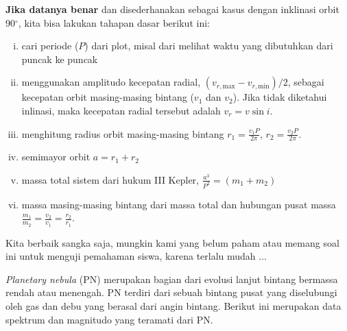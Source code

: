 \documentclass[11pt,fleqn]{exam}
\begin{document}
\begin{questions}
\vspace{1cm}
\textbf{Jika datanya benar} dan disederhanakan sebagai kasus dengan inklinasi orbit 90$^\circ$, kita bisa lakukan tahapan dasar berikut ini:
\begin{enumerate}[i.]
    \item cari periode ($P$) dari plot, misal dari melihat waktu yang dibutuhkan dari puncak ke puncak
    \item menggunakan amplitudo kecepatan radial, $(v_{r,\text{max}} - v_{r,\text{min}})/2$, sebagai kecepatan orbit masing-masing bintang ($v_1$ dan $v_2$). Jika tidak diketahui inlinasi, maka kecepatan radial tersebut adalah $v_r = v \sin{i}$.
    \item menghitung radius orbit masing-masing bintang $r_1 = \frac{v_1 P}{2 \pi}$, $r_2 = \frac{v_2 P}{2 \pi}$.
    \item semimayor orbit $a = r_1 + r_2$
    \item massa total sistem dari hukum III Kepler, $\frac{a^3}{P^2} = (m_1 + m_2)$
    \item massa masing-masing bintang dari massa total dan hubungan pusat massa $\frac{m_1}{m_2} = \frac{v_2}{v_1} = \frac{r_2}{r_1}$.
\end{enumerate}

\vspace{1cm}
Kita berbaik sangka saja, mungkin kami yang belum paham atau memang soal ini untuk menguji pemahaman siswa, karena terlalu mudah  ...

\newpage
\question \textit{Planetary nebula} (PN) merupakan bagian dari evolusi lanjut bintang bermassa rendah atau menengah. PN terdiri dari sebuah bintang pusat yang diselubungi oleh gas dan debu yang berasal dari angin bintang. Berikut ini merupakan data spektrum dan magnitudo yang teramati dari PN.


\end{questions}
\end{document}
